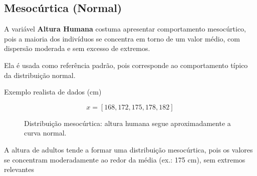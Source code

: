 \newpage
\subsection{Mesocúrtica (Normal)}

A variável \textbf{Altura Humana} costuma apresentar comportamento mesocúrtico, pois a maioria dos indivíduos se concentra em torno de um valor médio, com dispersão moderada e sem excesso de extremos. \vskip0.3cm

Ela é usada como referência padrão, pois corresponde ao comportamento típico da distribuição normal. \vskip0.3cm

Exemplo realista de dados (cm)

$$ x = {[168,172,175,178,182]} $$

\begin{figure}[H]
\centering
{}
\caption{Distribuição mesocúrtica: altura humana segue aproximadamente a curva normal.}
\end{figure}



A altura de adultos tende a formar uma distribuição mesocúrtica, pois os valores se concentram moderadamente ao redor da média (ex.: 175 cm), sem extremos relevantes


